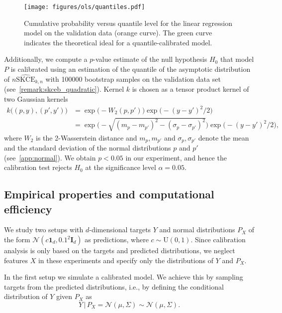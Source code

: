 \documentclass{article}
\begin{document}
\begin{figure}[hpt]
    \begin{center}
        \texttt{[image: figures/ols/quantiles.pdf]}
        \caption{Cumulative probability versus quantile level for the linear regression
        model on the validation data (orange curve). The green curve indicates the theoretical ideal
        for a quantile-calibrated model.}
        \label{fig:ols_quantiles}
    \end{center}
\end{figure}

Additionally, we compute a $p$-value estimate of the null hypothesis $H_0$ that model $P$
is calibrated using an estimation of the quantile of the asymptotic distribution
of $n \widehat{\mathrm{SKCE}}_{k,n}$ with 100000 bootstrap samples
on the validation data set (see~\cref{remark:skceb_quadratic}). Kernel $k$ is chosen
as a tensor product kernel of two Gaussian kernels
\begin{equation*}
    \begin{split}
        k\big((p, y), (p', y')\big) &= \exp{\big(-W_2(p, p')\big)} \exp{\big(-(y - y')^2/2 \big)} \\
        &= \exp{\bigg(-\sqrt{(m_p - m_{p'})^2 - (\sigma_p - \sigma_{p'})^2}\bigg)} \exp{\big(- (y - y')^2/2\big)},
    \end{split}
\end{equation*}
where $W_2$ is the 2-Wasserstein distance and $m_p, m_{p'}$ and $\sigma_p, \sigma_{p'}$ denote
the mean and the standard deviation of the normal distributions $p$ and $p'$ (see~\cref{app:normal}).
We obtain $p < 0.05$ in our experiment, and hence the calibration test rejects $H_0$ at the
significance level $\alpha = 0.05$.

\subsection{Empirical properties and computational efficiency}

We study two setups with $d$-dimensional targets $Y$ and normal distributions $P_X$
of the form $\mathcal{N}(c \mathbf{1}_d, 0.1^2 \mathbf{I}_d)$ as predictions,
where $c \sim \mathrm{U}(0, 1)$.
Since calibration analysis is only based on the targets and predicted distributions,
we neglect features $X$ in these experiments and specify only the distributions of
$Y$ and $P_X$.

In the first setup we simulate a calibrated model. We achieve this by sampling
targets from the predicted distributions, i.e., by defining the conditional
distribution of $Y$ given $P_X$ as
\begin{equation*}
    Y \,|\, P_X = \mathcal{N}(\mu, \Sigma) \sim \mathcal{N}(\mu, \Sigma).
\end{equation*}
\end{document}
